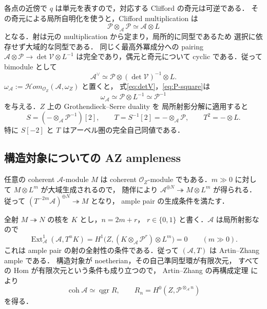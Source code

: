 各点の近傍で $q$ は単元を表すので，対応する Clifford の奇元は可逆である．
その奇元による局所自明化を使うと，Clifford multiplication は
\begin{equation}
 \mathcal P\otimes_{\mathcal A}\mathcal P\simeq\mathcal A\otimes L
 \label{eq:P-square}
\end{equation}
となる．射は元の multiplication から定まり，局所的に同型であるため
選択に依存せず大域的な同型である．
同じく最高外冪成分への pairing
$\mathcal A\otimes\mathcal P\to\det\mathcal V\otimes L^{-1}$
は完全であり，偶元と奇元について cyclic である．従って bimodule として
\[
 \mathcal A^\vee\simeq\mathcal P\otimes(\det\mathcal V)^{-1}\otimes L.
\]
$\omega_{\mathcal A}:=\mathcal Hom_{\mathcal O_Z}(\mathcal A,\omega_Z)$ と置くと，
式\eqref{eq:detV}，\eqref{eq:P-square}は
\begin{equation}
 \omega_{\mathcal A}\simeq\mathcal P\otimes L^{-1}\simeq\mathcal P^{-1}
 \label{eq:dualizing-order}
\end{equation}
を与える．$Z$ 上の Grothendieck--Serre duality を
局所射影分解に適用すると
\begin{equation}
 S=(-\otimes_{\mathcal A}\mathcal P^{-1})[2],\qquad
 T=S^{-1}[2]=-\otimes_{\mathcal A}\mathcal P,\qquad
 T^2=-\otimes L.
 \label{eq:Serre}
\end{equation}
特に $S[-2]$ と $T$ はアーベル圏の完全自己同値である．

\subsection{構造対象についての AZ ampleness}

任意の coherent $\mathcal A$-module $M$ は coherent $\mathcal O_Z$-module
でもある．$m\gg0$ に対して $M\otimes L^m$ が大域生成されるので，
随伴により $\mathcal A^{\oplus N}\twoheadrightarrow M\otimes L^m$ が得られる．
従って $(T^{-2m}\mathcal A)^{\oplus N}\twoheadrightarrow M$ となり，
ample pair の生成条件を満たす．

全射 $M\twoheadrightarrow N$ の核を $K$ とし，$n=2m+r$，
$r\in\{0,1\}$ と書く．$\mathcal A$ は局所射影なので
\[
 \operatorname{Ext}^1_{\mathcal A}(\mathcal A,T^nK)
 =H^1\bigl(Z,(K\otimes_{\mathcal A}\mathcal P^r)\otimes L^m\bigr)=0
 \qquad(m\gg0).
\]
これは ample pair の射の全射性の条件である．従って
$(\mathcal A,T)$ は Artin--Zhang ample である．
構造対象が noetherian，その自己準同型環が有限次元，
すべての Hom が有限次元という条件も成り立つので，
Artin--Zhang の再構成定理 \cite[Theorem~4.5(1)]{AZ1994} により
\begin{equation}
 \operatorname{coh}\mathcal A\simeq\operatorname{qgr}R,\qquad
 R_n=H^0(Z,\mathcal P^{\otimes_{\mathcal A}n})
 \label{eq:AZ-reconstruction}
\end{equation}
を得る．

